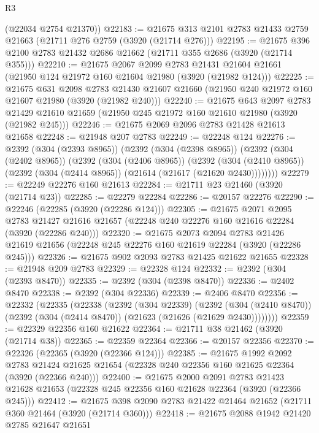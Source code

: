 \begin{lexlean}{R3}
\begin{coremodule}
      (@22034 @2754 @21370))
@22183 := @21675 @313 @2101 @2783 @21433 @2759 @21663 (@21711 @276 @2759 (@3920 (@21714 @276)))
@22195 := @21675 @396 @2100 @2783 @21432 @2686 @21662 (@21711 @355 @2686 (@3920 (@21714 @355)))
@22210 := @21675
    @2067
    @2099
    @2783
    @21431
    @21604
    @21661
    (@21950 @124 @21972 @160 @21604 @21980 (@3920 (@21982 @124)))
@22225 := @21675
    @631
    @2098
    @2783
    @21430
    @21607
    @21660
    (@21950 @240 @21972 @160 @21607 @21980 (@3920 (@21982 @240)))
@22240 := @21675
    @643
    @2097
    @2783
    @21429
    @21610
    @21659
    (@21950 @245 @21972 @160 @21610 @21980 (@3920 (@21982 @245)))
@22246 := @21675 @2069 @2096 @2783 @21428 @21613 @21658
@22248 := @21948 @207 @2783
@22249 := @22248 @124
@22276 := @2392
    (@304 (@2393 @8965))
    (@2392
      (@304 (@2398 @8965))
      (@2392
        (@304 (@2402 @8965))
        (@2392
          (@304 (@2406 @8965))
          (@2392
            (@304 (@2410 @8965))
            (@2392 (@304 (@2414 @8965)) (@21614 (@21617 (@21620 @2430))))))))
@22279 := @22249 @22276 @160 @21613
@22284 := @21711 @23 @21460 (@3920 (@21714 @23))
@22285 := @22279 @22284
@22286 := @20157 @22276
@22290 := @22246 (@22285 (@3920 (@22286 @124)))
@22305 := @21675
    @2071
    @2095
    @2783
    @21427
    @21616
    @21657
    (@22248 @240 @22276 @160 @21616 @22284 (@3920 (@22286 @240)))
@22320 := @21675
    @2073
    @2094
    @2783
    @21426
    @21619
    @21656
    (@22248 @245 @22276 @160 @21619 @22284 (@3920 (@22286 @245)))
@22326 := @21675 @902 @2093 @2783 @21425 @21622 @21655
@22328 := @21948 @209 @2783
@22329 := @22328 @124
@22332 := @2392 (@304 (@2393 @8470))
@22335 := @2392 (@304 (@2398 @8470))
@22336 := @2402 @8470
@22338 := @2392 (@304 @22336)
@22339 := @2406 @8470
@22356 := @22332
    (@22335
      (@22338
        (@2392
          (@304 @22339)
          (@2392
            (@304 (@2410 @8470))
            (@2392 (@304 (@2414 @8470)) (@21623 (@21626 (@21629 @2430))))))))
@22359 := @22329 @22356 @160 @21622
@22364 := @21711 @38 @21462 (@3920 (@21714 @38))
@22365 := @22359 @22364
@22366 := @20157 @22356
@22370 := @22326 (@22365 (@3920 (@22366 @124)))
@22385 := @21675
    @1992
    @2092
    @2783
    @21424
    @21625
    @21654
    (@22328 @240 @22356 @160 @21625 @22364 (@3920 (@22366 @240)))
@22400 := @21675
    @2000
    @2091
    @2783
    @21423
    @21628
    @21653
    (@22328 @245 @22356 @160 @21628 @22364 (@3920 (@22366 @245)))
@22412 := @21675 @398 @2090 @2783 @21422 @21464 @21652 (@21711 @360 @21464 (@3920 (@21714 @360)))
@22418 := @21675 @2088 @1942 @21420 @2785 @21647 @21651

\end{coremodule}
\end{lexlean}
